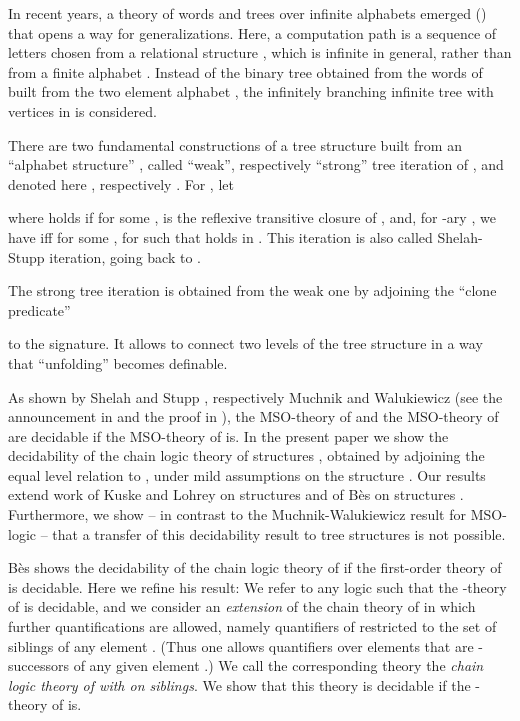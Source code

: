 \documentclass[copyright,creativecommons]{eptcs}
\theoremstyle{plain}
\theoremstyle{nonumberplain}
\begin{document}
In recent years, a theory of words and trees over infinite alphabets emerged
(\cite{nsv04,bmssd,cg09}) that opens a way for generalizations. 
Here,  a computation 
path is a sequence of letters chosen from a relational structure 
, which is infinite in general, rather than 
from a finite alphabet . Instead of the binary tree obtained from 
the words of  built from the two element alphabet , 
the infinitely branching infinite tree with vertices in  is considered.  

There are two fundamental constructions of a tree structure built from an ``alphabet structure''
, called ``weak'', respectively ``strong'' tree iteration of 
, and denoted here , respectively . 
For , let

where  holds if  for some , 
 is the reflexive transitive closure of , and, for -ary , we have  
 iff for some ,  for  such
that  holds in . 
This iteration is also called Shelah-Stupp iteration, going back 
to \cite{she75,stu75}. 

The strong tree iteration  is obtained from the weak one by adjoining 
the ``clone predicate'' 
 
to the 
signature. It allows to connect two levels of the tree structure in a way that 
``unfolding'' becomes definable. 

As shown by Shelah and Stupp \cite{she75,stu75}, respectively Muchnik and Walukiewicz (see the 
announcement in \cite{sem84} and the proof in \cite{wal02}), the MSO-theory 
of  and the MSO-theory of  are decidable if the 
MSO-theory of  is. In the present paper we show the decidability of the 
chain logic theory of structures , 
obtained by adjoining the equal level relation  to , 
under mild assumptions on the structure .   
Our results extend work of Kuske and Lohrey \cite{kl06} on structures 
and of B{\`e}s \cite{bes08} on structures . Furthermore, we show -- in contrast 
to the Muchnik-Walukiewicz result for MSO-logic --  that a transfer 
of this decidability result to tree structures  is not possible.

B{\`e}s shows the decidability of 
the chain logic theory of  if the first-order theory of  is
decidable. Here we refine his result: We refer to any logic  
such that the -theory of  is decidable, and we consider an 
{\em extension} of the chain theory of  in which further quantifications 
are allowed, namely quantifiers of  restricted to the set of siblings of 
any element . (Thus one allows quantifiers over elements  that are -successors 
of any given element .) We call the corresponding theory the {\em chain logic theory 
of  with  on siblings}. We show that this theory is decidable 
if the -theory of  is. 
\end{document}
